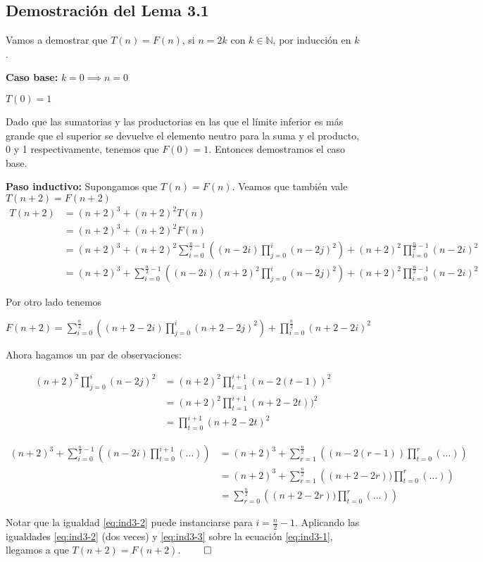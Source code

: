 \subsection{Demostración del Lema 3.1}

Vamos a demostrar que $T(n) = F(n)$, si $n=2k$ con $k\in\mathbb{N}$, por inducción en $k$.

\textbf{Caso base:} $k=0 \implies n=0$

  $T(0) = 1$ 

  Dado que las sumatorias y las productorias en las que el límite inferior es más grande que el superior se devuelve el elemento neutro para la suma y el producto, 0 y 1 respectivamente, tenemos que $F(0) = 1$. Entonces demostramos el caso base.

\textbf{Paso inductivo:} Supongamos que $T(n) = F(n)$. Veamos que también vale $T(n + 2) = F(n + 2)$ \\
  \begin{equation}
  \label{eq:ind3-1}
  \begin{aligned}
  T(n+2) &= (n+2)^3 + (n+2)^2 T(n) \\
         &= (n+2)^3 + (n+2)^2 F(n) \\
         &= (n+2)^3 + (n+2)^2 \sum_{i=0}^{\frac{n}{2}-1} \left((n-2i) \prod_{j=0}^{i}(n-2j)^2\right) + (n+2)^2 \prod_{i=0}^{\frac{n}{2}-1}(n-2i)^2\\
         &= (n+2)^3 + \sum_{i=0}^{\frac{n}{2}-1} \left((n-2i) (n+2)^2 \prod_{j=0}^{i}(n-2j)^2\right) + (n+2)^2 \prod_{i=0}^{\frac{n}{2}-1}(n-2i)^2
  \end{aligned}
  \end{equation}

  Por otro lado tenemos

  $F(n+2) = \sum_{i=0}^{\frac{n}{2}} \left((n+2-2i) \prod_{j=0}^{i}(n+2-2j)^2\right) + \prod_{i=0}^{\frac{n}{2}}(n+2-2i)^2$

  Ahora hagamos un par de observaciones:

  \begin{equation}
  \label{eq:ind3-2}
  \begin{aligned}
  (n+2)^2 \prod_{j=0}^{i}(n-2j)^2
  &= (n+2)^2 \prod_{t=1}^{i+1}(n-2(t-1))^2\\
  &= (n+2)^2 \prod_{t=1}^{i+1}(n+2-2t))^2\\
  &= \prod_{t=0}^{i+1}(n+2-2t)^2 
  \end{aligned}
  \end{equation}

  \begin{equation}
  \label{eq:ind3-3}
  \begin{aligned}
  (n+2)^3 + \sum_{i=0}^{\frac{n}{2}-1} \left((n-2i) \prod_{t=0}^{i+1}(\hdots)\right)
  &= (n+2)^3 + \sum_{r=1}^{\frac{n}{2}} \left((n-2(r-1)) \prod_{t=0}^{r}(\hdots)\right) \\
  &= (n+2)^3 + \sum_{r=1}^{\frac{n}{2}} \left((n+2-2r)) \prod_{t=0}^{r}(\hdots)\right) \\
  &= \sum_{r=0}^{\frac{n}{2}} \left((n+2-2r)) \prod_{t=0}^{r}(\hdots)\right)
  \end{aligned}
  \end{equation}

  Notar que la igualdad \ref{eq:ind3-2} puede instanciarse para $i = \frac{n}{2}-1$. 
  Aplicando las igualdades \ref{eq:ind3-2} (dos veces) y \ref{eq:ind3-3} sobre la ecuación \ref{eq:ind3-1}, llegamos a que $T(n + 2) = F(n + 2)$. $\qed$
